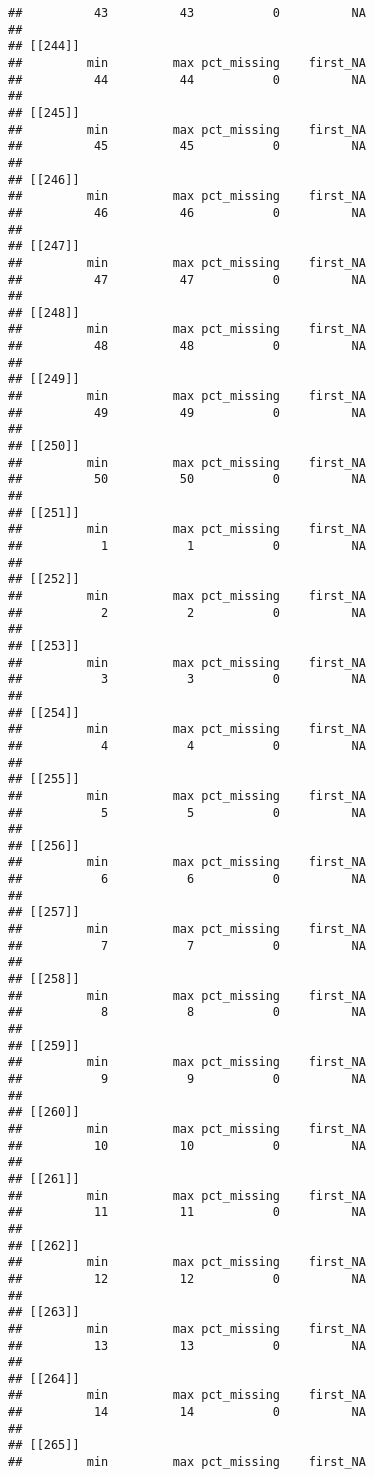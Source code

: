 \documentclass[
]{article}
\begin{document}
\begin{verbatim}
##          43          43           0          NA 
## 
## [[244]]
##         min         max pct_missing    first_NA 
##          44          44           0          NA 
## 
## [[245]]
##         min         max pct_missing    first_NA 
##          45          45           0          NA 
## 
## [[246]]
##         min         max pct_missing    first_NA 
##          46          46           0          NA 
## 
## [[247]]
##         min         max pct_missing    first_NA 
##          47          47           0          NA 
## 
## [[248]]
##         min         max pct_missing    first_NA 
##          48          48           0          NA 
## 
## [[249]]
##         min         max pct_missing    first_NA 
##          49          49           0          NA 
## 
## [[250]]
##         min         max pct_missing    first_NA 
##          50          50           0          NA 
## 
## [[251]]
##         min         max pct_missing    first_NA 
##           1           1           0          NA 
## 
## [[252]]
##         min         max pct_missing    first_NA 
##           2           2           0          NA 
## 
## [[253]]
##         min         max pct_missing    first_NA 
##           3           3           0          NA 
## 
## [[254]]
##         min         max pct_missing    first_NA 
##           4           4           0          NA 
## 
## [[255]]
##         min         max pct_missing    first_NA 
##           5           5           0          NA 
## 
## [[256]]
##         min         max pct_missing    first_NA 
##           6           6           0          NA 
## 
## [[257]]
##         min         max pct_missing    first_NA 
##           7           7           0          NA 
## 
## [[258]]
##         min         max pct_missing    first_NA 
##           8           8           0          NA 
## 
## [[259]]
##         min         max pct_missing    first_NA 
##           9           9           0          NA 
## 
## [[260]]
##         min         max pct_missing    first_NA 
##          10          10           0          NA 
## 
## [[261]]
##         min         max pct_missing    first_NA 
##          11          11           0          NA 
## 
## [[262]]
##         min         max pct_missing    first_NA 
##          12          12           0          NA 
## 
## [[263]]
##         min         max pct_missing    first_NA 
##          13          13           0          NA 
## 
## [[264]]
##         min         max pct_missing    first_NA 
##          14          14           0          NA 
## 
## [[265]]
##         min         max pct_missing    first_NA 

\end{verbatim}
\end{document}
